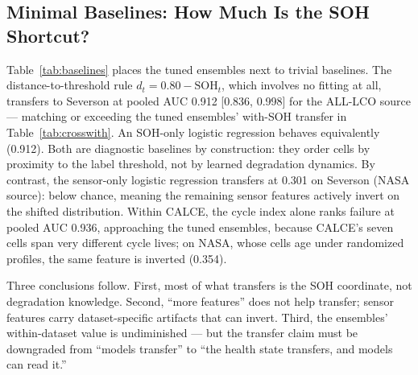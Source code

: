 \documentclass[preprint,12pt]{elsarticle}
\begin{document}
\subsection{Minimal Baselines: How Much Is the SOH Shortcut?}
Table~\ref{tab:baselines} places the tuned ensembles next to trivial baselines. The distance-to-threshold rule $d_t = 0.80 - \mathrm{SOH}_t$, which involves no fitting at all, transfers to Severson at pooled AUC 0.912 [0.836, 0.998] for the ALL-LCO source --- matching or exceeding the tuned ensembles' with-SOH transfer in Table~\ref{tab:crosswith}. An SOH-only logistic regression behaves equivalently (0.912). Both are diagnostic baselines by construction: they order cells by proximity to the label threshold, not by learned degradation dynamics. By contrast, the sensor-only logistic regression transfers at 0.301 on Severson (NASA source): below chance, meaning the remaining sensor features actively invert on the shifted distribution. Within CALCE, the cycle index alone ranks failure at pooled AUC 0.936, approaching the tuned ensembles, because CALCE's seven cells span very different cycle lives; on NASA, whose cells age under randomized profiles, the same feature is inverted (0.354).

Three conclusions follow. First, most of what transfers is the SOH coordinate, not degradation knowledge. Second, ``more features'' does not help transfer; sensor features carry dataset-specific artifacts that can invert. Third, the ensembles' within-dataset value is undiminished --- but the transfer claim must be downgraded from ``models transfer'' to ``the health state transfers, and models can read it.''
\end{document}
